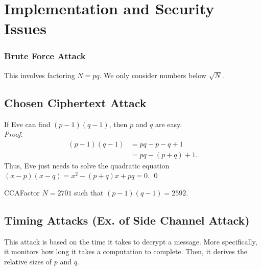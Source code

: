 \section{Implementation and Security Issues}

\subsubsection{Brute Force Attack}

This involves factoring \(N = pq\). We only consider numbers below \(\sqrt{N}\).


\subsection{Chosen Ciphertext Attack}
\label{sec:Ciphertext Attack}

If Eve can find \((p-1)(q-1)\), then \(p\) and \(q\) are easy.  \\

\noindent \textit{Proof.} \begin{align*}
    (p-1)(q-1) & = pq - p - q + 1   \\
               & = pq - (p +q) + 1.
\end{align*} Thus, Eve just needs to solve the quadratic equation \((x-p)(x-q) = x^2 - (p+q)x + pq = 0\). \qed

\begin{example}
    {CCA}Factor \(N = 2701\) such that \((p-1)(q - 1) = 2592\).
\end{example}


\subsection{Timing Attacks (Ex. of Side Channel Attack)}

This attack is based on the time it takes to decrypt a message. More specifically, it monitors how long it takes a computation to complete. Then, it derives the relative sizes of \(p\) and \(q\).

